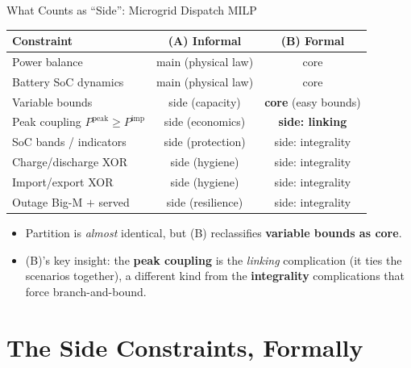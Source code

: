 \documentclass[aspectratio=169]{beamer}
\begin{document}
\begin{frame}{What Counts as ``Side'': Microgrid Dispatch MILP}
\centering
\scriptsize
\begin{tabular}{lcc}
\toprule
Constraint & (A) Informal & (B) Formal \\
\midrule
Power balance                       & main (physical law) & core \\
Battery SoC dynamics                & main (physical law) & core \\
Variable bounds                     & side (capacity)     & \textbf{core} (easy bounds) \\
Peak coupling $P^{\text{peak}}\!\ge\!P^{\text{imp}}$ & side (economics) & \textbf{side: linking} \\
SoC bands / indicators              & side (protection)   & side: integrality \\
Charge/discharge XOR                & side (hygiene)      & side: integrality \\
Import/export XOR                    & side (hygiene)      & side: integrality \\
Outage Big-M $+$ served             & side (resilience)   & side: integrality \\
\bottomrule
\end{tabular}
\vspace{0.3cm}
\begin{itemize}\footnotesize
    \item Partition is \emph{almost} identical, but (B) reclassifies
          \textbf{variable bounds as core}.
    \item (B)'s key insight: the \textbf{peak coupling} is the \emph{linking}
          complication (it ties the scenarios together), a different kind from the
          \textbf{integrality} complications that force branch-and-bound.
\end{itemize}
\end{frame}


\section{The Side Constraints, Formally}
\end{document}
